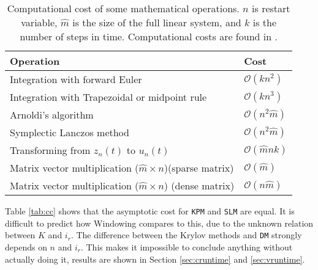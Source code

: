 \begin{table}
\caption{Computational cost of some mathematical operations. $n$ is restart variable, $\hat{m}$ is the size of the full linear system, and $k$ is the number of steps in time. Computational costs are found in \cite{complex}. }
\centering
\begin{tabular}{l l }
Operation & Cost \\
\hline
Integration with forward Euler & $\mathcal{O}(k n^2)$ \\
Integration with Trapezoidal or midpoint rule & $\mathcal{O}(k n^3)$ \\
Arnoldi's algorithm & $ \mathcal{ O }(n^2 \hat{m})$ \\
Symplectic Lanczos method & $ \mathcal{O}(n^2 \hat{m}) $\\
Transforming from $z_n(t)$ to $u_n(t)$ & $ \mathcal{O}(\hat{m}nk) $\\
Matrix vector multiplication ($\hat{m}\times n$)(sparse matrix) & $ \mathcal{O}(\hat{m}) $ \\
Matrix vector multiplication ($\hat{m}\times n$) (dense matrix) & $ \mathcal{O}(n \hat{m}) $
\end{tabular}


\label{tab:cd}
\end{table}

\noindent Table \ref{tab:cc} shows that the asymptotic cost for \texttt{KPM} and \texttt{SLM} are equal. It is difficult to predict how Windowing compares to this, due to the unknown relation between $K$ and $i_r$. The difference between the Krylov methods and \texttt{DM} strongly depends on $n$ and $i_r$. This makes it impossible to conclude anything without actually doing it, results are shown in Section \ref{sec:cruntime} and \ref{sec:vruntime}. \\

